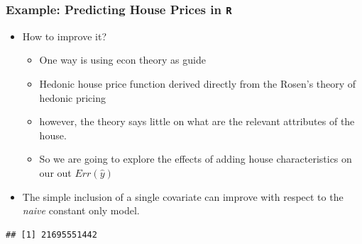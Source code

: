 \documentclass[
  shownotes,
  xcolor={svgnames},
  hyperref={colorlinks,citecolor=DarkBlue,linkcolor=DarkRed,urlcolor=DarkBlue}
  , aspectratio=169]{beamer}
\newenvironment{Shaded}{\begin{snugshade}}{\end{snugshade}}
\newcommand{\DataTypeTok}[1]{\textcolor[rgb]{0.13,0.29,0.53}{#1}}
\newcommand{\DecValTok}[1]{\textcolor[rgb]{0.00,0.00,0.81}{#1}}
\newcommand{\KeywordTok}[1]{\textcolor[rgb]{0.13,0.29,0.53}{\textbf{#1}}}
\newcommand{\NormalTok}[1]{#1}
\newcommand{\OperatorTok}[1]{\textcolor[rgb]{0.81,0.36,0.00}{\textbf{#1}}}
\begin{document}
\begin{frame}[fragile]
\frametitle{Example: Predicting House Prices in \texttt{R}}

\begin{itemize}
 \item How to improve it?
   \begin{itemize}
   \item One way is using econ theory as guide
   \item Hedonic house price function derived directly from the Rosen's theory of hedonic pricing
   \item however, the theory says little on what are the relevant attributes of the house.
   \item So we are going to explore the effects of adding house characteristics on our out $Err(\hat y)$
  \end{itemize}
  \item The simple inclusion of a single covariate can improve with respect to the \textit{naive} constant only model.
\end{itemize}



\begin{Shaded}
\footnotesize
{}
\end{Shaded}

\begin{tiny}
\begin{verbatim}
## [1] 21695551442
\end{verbatim}
\end{tiny}
\end{frame}
\end{document}
